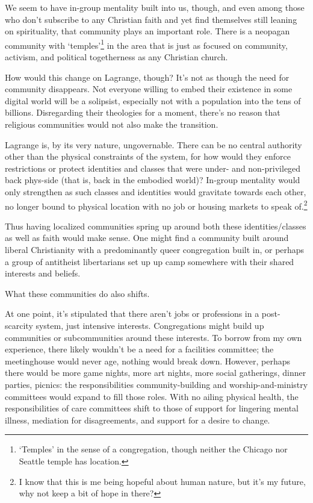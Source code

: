 We seem to have in-group mentality built into us, though, and even among those who don't subscribe to any Christian faith and yet find themselves still leaning on spirituality, that community plays an important role. There is a neopagan community with `temples'\footnote{`Temples' in the sense of a congregation, though neither the Chicago nor Seattle temple has location.} in the area that is just as focused on community, activism, and political togetherness as any Christian church.

How would this change on Lagrange, though? It's not as though the need for community disappears. Not everyone willing to embed their existence in some digital world will be a solipsist, especially not with a population into the tens of billions. Disregarding their theologies for a moment, there's no reason that religious communities would not also make the transition.

Lagrange is, by its very nature, ungovernable. There can be no central authority other than the physical constraints of the system, for how would they enforce restrictions or protect identities and classes that were under- and non-privileged back phys-side (that is, back in the embodied world)? In-group mentality would only strengthen as such classes and identities would gravitate towards each other, no longer bound to physical location with no job or housing markets to speak of.\footnote{I know that this is me being hopeful about human nature, but it's my future, why not keep a bit of hope in there?}

Thus having localized communities spring up around both these identities/classes as well as faith would make sense. One might find a community built around liberal Christianity with a predominantly queer congregation built in, or perhaps a group of antitheist libertarians set up up camp somewhere with their shared interests and beliefs.

What these communities do also shifts.

At one point, it's stipulated that there aren't jobs or professions in a post-scarcity system, just intensive interests. Congregations might build up communities or subcommunities around these interests. To borrow from my own experience, there likely wouldn't be a need for a facilities committee; the meetinghouse would never age, nothing would break down. However, perhaps there would be more game nights, more art nights, more social gatherings, dinner parties, picnics: the responsibilities community-building and worship-and-ministry committees would expand to fill those roles. With no ailing physical health, the responsibilities of care committees shift to those of support for lingering mental illness, mediation for disagreements, and support for a desire to change.

